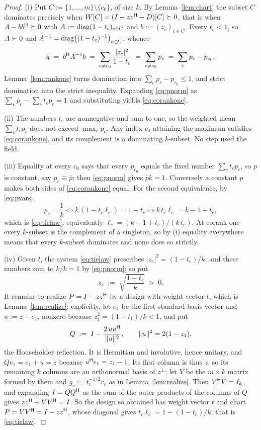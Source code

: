 \begin{proof}
(i) Put $C:=\{1,\dots,m\}\setminus\{c_0\}$, of size $k$.  By
Lemma~\ref{lem:chart} the subset $C$ dominates precisely when
$W[C]=(I-zz^{\mathsf{H}}-D)[C]\succeq0$, that is when $A-bb^{\mathsf{H}}\succeq0$ with
$A:=\operatorname{diag}(1-t_c)_{c\in C}$ and $b:=(z_c)_{c\in C}$.  Every $t_c<1$, so
$A\succ0$ and $A^{-1}=\operatorname{diag}\bigl((1-t_c)^{-1}\bigr)_{c\in C}$, whence
\[
  q\;=\;b^{\mathsf{H}} A^{-1}b\;=\;\sum_{c\ne c_0}\frac{\lvert
  z_c\rvert^2}{1-t_c}\;=\;\sum_{c\ne c_0}p_c\;=\;\sum_c p_c-p_{c_0}.
\]
Lemma~\ref{lem:rankone} turns domination into $\sum_cp_c-p_{c_0}\le1$,
and strict domination into the strict inequality.  Expanding
\eqref{eq:pnorm} as $\sum_cp_c-\sum_ct_cp_c=1$ and substituting yields
\eqref{eq:corankone}.

(ii) The numbers $t_c$ are nonnegative and sum to one, so the weighted
mean $\sum_ct_cp_c$ does not exceed $\max_cp_c$.  Any index $c_0$
attaining the maximum satisfies \eqref{eq:corankone}, and its complement
is a dominating $k$-subset.  No step used the field.

(iii) Equality at every $c_0$ says that every $p_{c_0}$ equals the fixed
number $\sum_ct_cp_c$, so $p$ is constant, say $p_c\equiv\bar p$; then
\eqref{eq:pnorm} gives $\bar pk=1$.  Conversely a constant $p$ makes both
sides of \eqref{eq:corankone} equal.  For the second equivalence, by
\eqref{eq:pvars},
\[
  p_c=\frac1k
  \iff k\,(1-t_c\ell_c)=1-t_c
  \iff k\,t_c\ell_c=k-1+t_c ,
\]
which is \eqref{eq:tielaw}; equivalently
$\ell_c=(k-1+t_c)/(k\,t_c)$.  At corank one every $k$-subset is the
complement of a singleton, so by (i) equality everywhere means that every
$k$-subset dominates and none does so strictly.

(iv) Given $t$, the system \eqref{eq:tielaw} prescribes
$\lvert z_c\rvert^2=(1-t_c)/k$, and these numbers sum to $k/k=1$ by
\eqref{eq:pnorm}; so put
\[
  z_c\;:=\;\sqrt{\frac{1-t_c}{k}}\;>\;0 .
\]
It remains to realize $P=I-zz^{\mathsf{H}}$ by a design with weight vector $t$,
which is Lemma~\ref{lem:realize}; explicitly, let $e_1$ be the first
standard basis vector and $u:=z-e_1$, nonzero because
$z_1^2=(1-t_1)/k<1$, and put
\[
  Q\;:=\;I-\frac{2\,uu^{\mathsf{H}}}{\lVert u\rVert^2},
  \qquad \lVert u\rVert^2=2(1-z_1),
\]
the Householder reflection.  It is Hermitian and involutive, hence
unitary, and $Qe_1=e_1+u=z$ because $u^{\mathsf{H}} e_1=z_1-1$.  Its first column
is thus $z$, so its remaining $k$ columns are an orthonormal basis of
$z^{\perp}$; let $V$ be the $m\times k$ matrix formed by them and
$g_c:=t_c^{-1/2}v_c$ as in Lemma~\ref{lem:realize}.  Then $V^{\mathsf{H}} V=I_k$,
and expanding $I=QQ^{\mathsf{H}}$ as the sum of the outer products of the columns
of $Q$ gives $zz^{\mathsf{H}}+VV^{\mathsf{H}}=I$.  So the design so obtained has weight
vector $t$ and chart $P=VV^{\mathsf{H}}=I-zz^{\mathsf{H}}$, whose diagonal gives
$t_c\ell_c=1-(1-t_c)/k$, that is \eqref{eq:tielaw}.
\end{proof}

